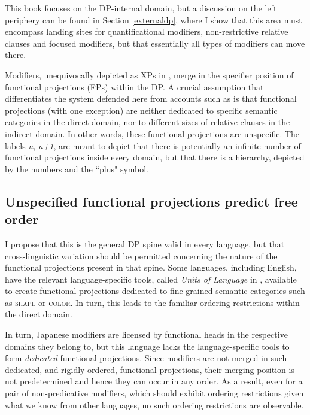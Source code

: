 This book focuses on the DP-internal domain, but a discussion on the left periphery can be found in Section \ref{externaldp}, where I show that this area must encompass landing sites for quantificational modifiers, non-restrictive relative clauses and focused modifiers, but that essentially all types of modifiers can move there.

Modifiers, unequivocally depicted as XPs in , merge in the specifier position of functional projections (FPs) within the DP. A crucial assumption that differentiates the system defended here from accounts such as \citet{cinque:2010:adj, cinque:2020:relcl} is that functional projections (with one exception) are neither dedicated to specific semantic categories in the direct domain, nor to different sizes of relative clauses in the indirect domain. In other words, these functional projections are unspecific. The labels \textit{n}, \textit{n+1}, are meant to depict that there is potentially an infinite number of functional projections inside every domain, but that there is a hierarchy, depicted by the numbers and the ``plus" symbol.

\subsection{Unspecified functional projections predict free order}

I propose that this is the general DP spine valid in every language, but that cross-linguistic variation should be permitted concerning the nature of the functional projections present in that spine. Some languages, including English, have the relevant language-specific tools, called \textit{Units of Language} in \citet{wiltschko:2014:universal}, available to create functional projections dedicated to fine-grained semantic categories such as \textsc{shape} or \textsc{color}. In turn, this leads to the familiar ordering restrictions within the direct domain.

In turn, Japanese modifiers are licensed by functional heads in the respective domains they belong to, but this language lacks the language-specific tools to form \textit{dedicated} functional projections. Since modifiers are not merged in such dedicated, and rigidly ordered, functional projections, their merging position is not predetermined and hence they can occur in any order. As a result, even for a pair of non-predicative modifiers, which should exhibit ordering restrictions given what we know from other languages, no such ordering restrictions are observable.


